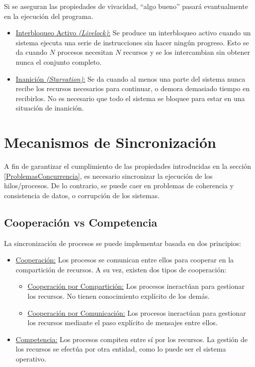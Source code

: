Si se aseguran las propiedades de vivacidad, ``algo bueno'' pasará evantualmente
en la ejecución del programa.

\begin{itemize}
    \item \underline{Interbloqueo Activo \textit{(Livelock)}:} Se produce un
    interbloqueo activo cuando un sistema ejecuta una serie de instrucciones sin hacer ningún
    progreso. Esto se da cuando $N$ procesos necesitan $N$ recursos y se los
    intercambian sin obtener nunca el conjunto completo.
    \item \underline{Inanición \textit{(Starvation)}:} Se da cuando al menos una
    parte del sistema nunca recibe los recursos necesarios para continuar, o demora demasiado
    tiempo en recibirlos. No es necesario que todo el sistema se bloquee para
    estar en una situación de inanición.
\end{itemize}

\section{Mecanismos de Sincronización}

A fin de garantizar el cumplimiento de las propiedades introducidas en la
sección \ref{ProblemasConcurrencia}, es necesario sincronizar la ejecución de
los hilos/procesos. De lo contrario, se puede caer en problemas de coherencia y
consistencia de datos, o corrupción de los sistemas.

\subsection{Cooperación vs Competencia}

La sincronización de procesos se puede implementar basada en dos principios:
\begin{itemize}
    \item \underline{Cooperación:} Los procesos se comunican entre ellos para
    cooperar en la compartición de recursos. A su vez, existen dos tipos de
    cooperación:
    \begin{itemize}
        \item \underline{Cooperación por Compartición:} Los procesos ineractúan
        para gestionar los recursos. No tienen conocimiento explícito de los demás.
        \item \underline{Cooperación por Comunicación:} Los procesos ineractúan
        para gestionar los recursos mediante el paso explícito de mensajes entre
        ellos.
    \end{itemize}
    \item \underline{Competencia:} Los procesos compiten entre sí por los
    recursos. La gestión de los recursos se efectúa por otra entidad, como lo
    puede ser el sistema operativo.
\end{itemize}

